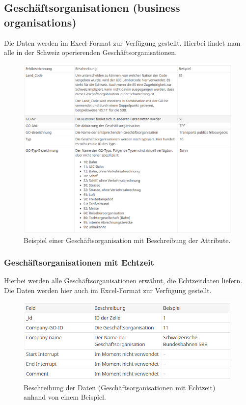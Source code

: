\subsection{Geschäftsorganisationen (business organisations)}
\label{Geschaeftsorganisationen}
Die Daten werden im Excel-Format zur Verfügung gestellt. Hierbei findet man alle in der Schweiz operierenden Geschäftsorganisationen.
\begin{figure}[]
	\centering
	\includegraphics[width=12cm]{img/GOuebersicht.png}
	\caption{Beispiel einer Geschäftsorganisation mit Beschreibung der Attribute. \cite{geschaeftsorganisation}}
	\label{fig:Uebersicht Geschaeftsorganisationen}
\end{figure}
\subsubsection{Geschäftsorganisationen mit Echtzeit}
\label{Geschaeftsorganisationen mit Echtzeit}
Hierbei werden alle Geschäftsorganisationen erwähnt, die Echtzeitdaten liefern. Die Daten werden hier auch im Excel-Format zur Verfügung gestellt.

\begin{figure}[]
	\centering
	\includegraphics[width=12cm]{img/GO-Realtime.png}
	\caption{Beschreibung der Daten (Geschäftsorganisationen mit Echtzeit) anhand von einem Beispiel.\cite{geschaeftsorganisation-rt}}
	\label{fig:Uebersicht Geschaeftsorganisationen Echtzeit}
\end{figure}

